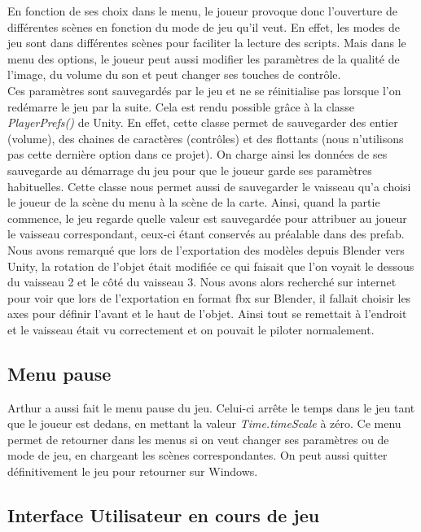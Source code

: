\documentclass[12pt, titlepage]{article}
\begin{document}
\begin{spacing}{1.5}
En fonction de ses choix dans le menu, le joueur provoque donc l'ouverture de différentes scènes en fonction du mode de jeu qu'il veut. En effet, les modes de jeu sont dans différentes scènes pour faciliter la lecture des scripts. Mais dans le menu des options, le joueur peut aussi modifier les paramètres de la qualité de l'image, du volume du son et peut changer ses touches de contrôle.\\

Ces paramètres sont sauvegardés par le jeu et ne se réinitialise pas lorsque l'on redémarre le jeu par la suite. Cela est rendu possible grâce à la classe \textit{PlayerPrefs()} de Unity. En effet, cette classe permet de sauvegarder des entier (volume), des chaines de caractères (contrôles) et des flottants (nous n'utilisons pas cette dernière option dans ce projet). On charge ainsi les données de ses sauvegarde au démarrage du jeu pour que le joueur garde ses paramètres habituelles. Cette classe nous permet aussi de sauvegarder le vaisseau qu'a choisi le joueur de la scène du menu à la scène de la carte. Ainsi, quand la partie commence, le jeu regarde quelle valeur est sauvegardée pour attribuer au joueur le vaisseau correspondant, ceux-ci étant conservés au préalable dans des prefab.\\

 Nous avons remarqué que lors de l'exportation des modèles depuis Blender vers Unity, la rotation de l'objet était modifiée ce qui faisait que l'on voyait le dessous du vaisseau 2 et le côté du vaisseau 3. Nous avons alors recherché sur internet pour voir que lors de l'exportation en format fbx sur Blender, il fallait choisir les axes pour définir l'avant et le haut de l'objet. Ainsi tout se remettait à l'endroit et le vaisseau était vu correctement et on pouvait le piloter normalement.\\

\subsection{Menu pause}

Arthur a aussi fait le menu pause du jeu. Celui-ci arrête le temps dans le jeu tant que le joueur est dedans, en mettant la valeur \textit{Time.timeScale} à zéro. Ce menu permet de retourner dans les menus si on veut changer ses paramètres ou de mode de jeu, en chargeant les scènes correspondantes. On peut aussi quitter définitivement le jeu pour retourner sur Windows.

\subsection{Interface Utilisateur en cours de jeu}


\end{spacing}
\end{document}
